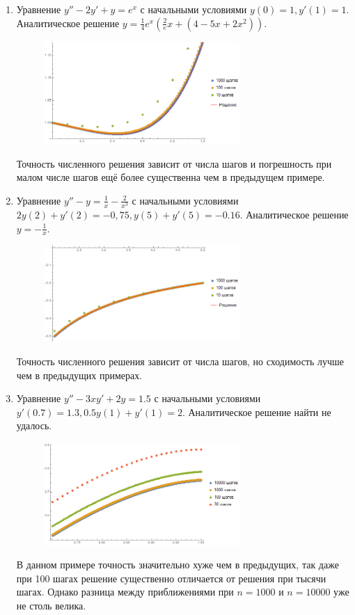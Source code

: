 \documentclass[a4paper,12pt,titlepage,finall]{article}
\begin{document}
\begin{enumerate}
\item
Уравнение $y'' - 2y' + y = e^x$ с начальными условиями $y(0) = 1, y'(1) = 1$. Аналитическое решение $y = \frac{1}{4} e^{x} (\frac{2}{e} x + (4 - 5 x + 2 x^2))$.
\begin{figure}[h]
\centering
\includegraphics[width=0.7\textwidth]{test_2_2.png}
\end{figure}
\par
Точность численного решения зависит от числа шагов и погрешность при малом числе шагов ещё более существенна чем в предыдущем примере.
\newpage
\item
Уравнение $y'' - y = \frac{1}{x} - \frac{2}{x^3}$ с начальными условиями $2y(2) + y'(2) = -0,75, y(5) + y'(5) = -0.16$. Аналитическое решение $y = -\frac{1}{x}$.
\begin{figure}[h]
\centering
\includegraphics[width=0.7\textwidth]{test_2_3.png}
\end{figure}
\par
Точность численного решения зависит от числа шагов, но сходимость лучше чем в предыдущих примерах.

\item
Уравнение $y'' -3xy' + 2y = 1.5$ с начальными условиями $y'(0.7) = 1.3, 0.5 y(1) + y'(1) = 2$. Аналитическое решение найти не удалось.
\begin{figure}[h]
\centering
\includegraphics[width=0.7\textwidth]{test_2_4.png}
\end{figure}
\par
В данном примере точность значительно хуже чем в предыдущих, так даже при 100 шагах решение существенно отличается от решения при тысячи шагах. Однако разница между приближениями при $n = 1000$ и $n = 10000$ уже не столь велика.
\end{enumerate}
\end{document}
